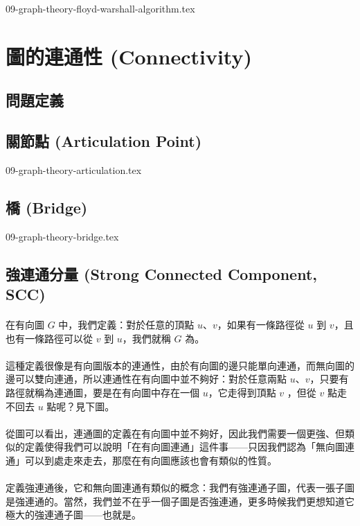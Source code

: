 \documentclass[12pt,a4paper,oneside]{report}
\begin{document}
\begin{CJK}{UTF8}{bkai}
{09-graph-theory-floyd-warshall-algorithm.tex}

\section{圖的連通性 (Connectivity)}
\subsection{問題定義}
\subsection{關節點 (Articulation Point)}

{09-graph-theory-articulation.tex}

\subsection{橋 (Bridge)}

{09-graph-theory-bridge.tex}

\subsection{強連通分量 (Strong Connected Component, SCC)}
\paragraph{}在有向圖 $G$ 中，我們定義：對於任意的頂點 $u$、$v$，如果有一條路徑從 $u$ 到 $v$，且也有一條路徑可以從 $v$ 到 $u$，我們就稱 $G$ 為\textbf{}。
\paragraph{}這種定義很像是有向圖版本的連通性，由於有向圖的邊只能單向連通，而無向圖的邊可以雙向連通，所以連通性在有向圖中並不夠好：對於任意兩點 $u$、$v$，只要有路徑就稱為連通圖，要是在有向圖中存在一個 $u$，它走得到頂點 $v$ ，但從 $v$ 點走不回去 $u$ 點呢？見下圖。
\paragraph{}從圖可以看出，連通圖的定義在有向圖中並不夠好，因此我們需要一個更強、但類似的定義使得我們可以說明「在有向圖連通」這件事------只因我們認為「無向圖連通」可以到處走來走去，那麼在有向圖應該也會有類似的性質。
\paragraph{}定義強連通後，它和無向圖連通有類似的概念：我們有強連通子圖，代表一張子圖是強連通的。當然，我們並不在乎一個子圖是否強連通，更多時候我們更想知道它極大的強連通子圖------也就是\textbf{}。

\end{CJK}
\end{document}
